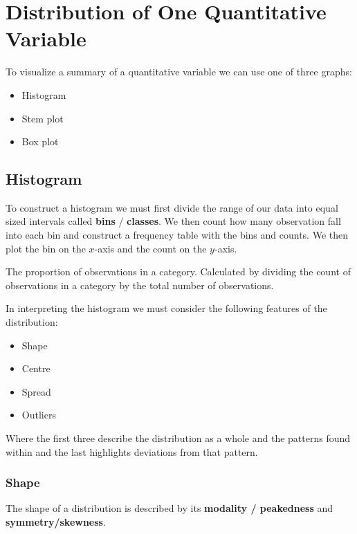 \documentclass[12pt letter]{report}
\begin{document}
\section{Distribution of One Quantitative Variable}

To visualize a summary of a quantitative variable we can use one of three graphs:
\begin{itemize}
	\item Histogram
	\item Stem plot
	\item Box plot
\end{itemize}

\subsection{Histogram}

To construct a histogram we must first divide the range of our data into equal sized intervals called \textbf{bins} /
\textbf{classes}. We then count how many observation fall into each bin and construct a frequency table with the bins
and counts. We then plot the bin on the $x$-axis and the count on the $y$-axis.

 {
	The proportion of observations in a category. Calculated by dividing the count of observations in a category by the
	total number of observations.
}

In interpreting the histogram we must consider the following features of the distribution:
\begin{itemize}
	\item Shape
	\item Centre
	\item Spread
	\item Outliers
\end{itemize}

Where the first three describe the distribution as a whole and the patterns found within and the last highlights deviations from that pattern.

\subsubsection{Shape}

The shape of a distribution is described by its \textbf{modality / peakedness} and \textbf{symmetry/skewness}.


\end{document}
